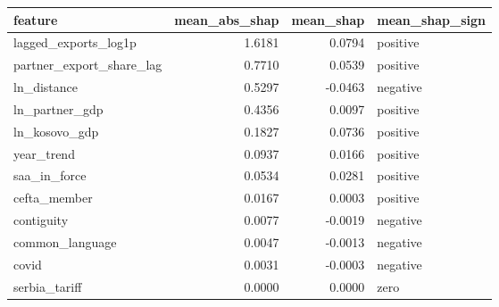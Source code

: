 \begin{tabular}{lrrl}
\toprule
feature & mean\_abs\_shap & mean\_shap & mean\_shap\_sign \\
\midrule
lagged\_exports\_log1p & 1.6181 & 0.0794 & positive \\
partner\_export\_share\_lag & 0.7710 & 0.0539 & positive \\
ln\_distance & 0.5297 & -0.0463 & negative \\
ln\_partner\_gdp & 0.4356 & 0.0097 & positive \\
ln\_kosovo\_gdp & 0.1827 & 0.0736 & positive \\
year\_trend & 0.0937 & 0.0166 & positive \\
saa\_in\_force & 0.0534 & 0.0281 & positive \\
cefta\_member & 0.0167 & 0.0003 & positive \\
contiguity & 0.0077 & -0.0019 & negative \\
common\_language & 0.0047 & -0.0013 & negative \\
covid & 0.0031 & -0.0003 & negative \\
serbia\_tariff & 0.0000 & 0.0000 & zero \\
\bottomrule
\end{tabular}
